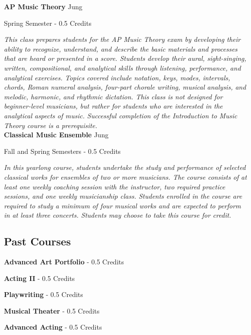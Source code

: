\noindent\textbf{AP Music Theory} \hfill Jung

\noindent Spring Semester - 0.5 Credits

\vspace{1mm}\emph{This class prepares students for the AP Music Theory exam by developing their ability to recognize, understand, and describe the basic materials and processes that are heard or presented in a score. Students develop their aural, sight-singing, written, compositional, and analytical skills through listening, performance, and analytical exercises. Topics covered include notation, keys, modes, intervals, chords, Roman numeral analysis, four-part chorale writing, musical analysis, and melodic, harmonic, and rhythmic dictation. This class is not designed for beginner-level musicians, but rather for students who are interested in the analytical aspects of music. Successful completion of the Introduction to Music Theory course is a prerequisite.}\\

\noindent\textbf{Classical Music Ensemble} \hfill Jung

\noindent Fall and Spring Semesters - 0.5 Credits

\vspace{1mm}\emph{In this yearlong course, students undertake the study and performance of selected classical works for ensembles of two or more musicians. The course consists of at least one weekly coaching session with the instructor, two required practice sessions, and one weekly musicianship class. Students enrolled in the course are required to study a minimum of four musical works and are expected to perform in at least three concerts. Students may choose to take this course for credit.}\\

\subsection{Past Courses}
\noindent\textbf{Advanced Art Portfolio}  - 0.5 Credits

\vspace{3mm}\noindent\textbf{Acting II}  - 0.5 Credits

\vspace{3mm}\noindent\textbf{Playwriting}  - 0.5 Credits

\vspace{3mm}\noindent\textbf{Musical Theater}  - 0.5 Credits

\vspace{3mm}\noindent\textbf{Advanced Acting}  - 0.5 Credits

